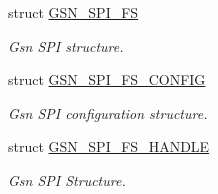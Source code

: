 \begin{DoxyCompactItemize}
struct \hyperlink{a00232}{GSN\_\-SPI\_\-FS}
\begin{DoxyCompactList}\small\item\em Gsn SPI structure. \end{DoxyCompactList}\item 
struct \hyperlink{a00233}{GSN\_\-SPI\_\-FS\_\-CONFIG}
\begin{DoxyCompactList}\small\item\em Gsn SPI configuration structure. \end{DoxyCompactList}\item 
struct \hyperlink{a00234}{GSN\_\-SPI\_\-FS\_\-HANDLE}
\begin{DoxyCompactList}\small\item\em Gsn SPI Structure. \end{DoxyCompactList}\end{DoxyCompactItemize}
